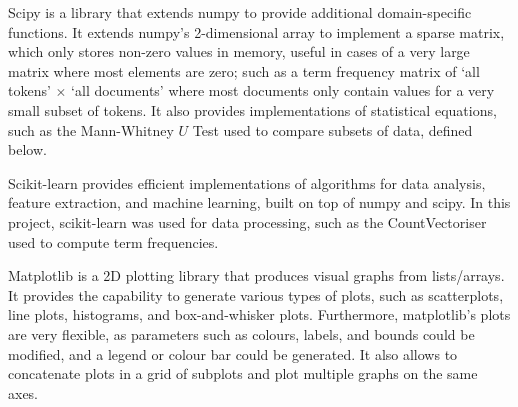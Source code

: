 \documentclass{report}
\begin{document}
Scipy \cite{Scipy} is a library that extends numpy to provide additional domain-specific functions. It extends numpy's 2-dimensional array to implement a sparse matrix, which only stores non-zero values in memory, useful in cases of a very large matrix where most elements are zero; such as a term frequency matrix of `all tokens' $\times$ `all documents' where most documents only contain values for a very small subset of tokens.
It also provides implementations of statistical equations, such as the Mann-Whitney $U$ Test used to compare subsets of data, defined below. 

Scikit-learn \cite{Scikit-learn} provides efficient implementations of algorithms for data analysis, feature extraction, and machine learning, built on top of numpy and scipy.
In this project, scikit-learn was used for data processing, such as the CountVectoriser used to compute term frequencies.

Matplotlib \cite{Matplotlib} is a 2D plotting library that produces visual graphs from lists/arrays.
It provides the capability to generate various types of plots, such as scatterplots, line plots, histograms, and box-and-whisker plots.
Furthermore, matplotlib's plots are very flexible, as parameters such as colours, labels, and bounds could be modified, and a legend or colour bar could be generated.
It also allows to concatenate plots in a grid of subplots and plot multiple graphs on the same axes.
\end{document}
